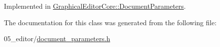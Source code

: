 Implemented in \hyperlink{classGraphicalEditorCore_1_1DocumentParameters_af84100459d1e49474e57e5b7b16f1750}{Graphical\+Editor\+Core\+::\+Document\+Parameters}.



The documentation for this class was generated from the following file\+:\begin{DoxyCompactItemize}
\item 
05\+\_\+editor/\hyperlink{document__parameters_8h}{document\+\_\+parameters.\+h}\end{DoxyCompactItemize}
